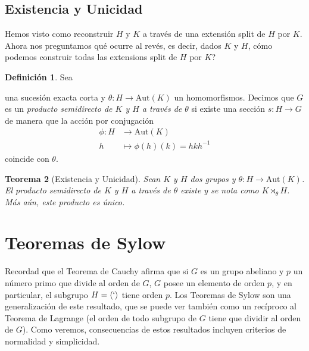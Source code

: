 \documentclass[a4paper,11pt]{amsart}
\theoremstyle{plain}
\newtheorem{thm}{Teorema}[section]
\theoremstyle{definition}
\newtheorem{defi}[thm]{Definición}
\theoremstyle{remark}
\begin{document}
\subsection{Existencia y Unicidad}

Hemos visto como reconstruir $H$ y $K$ a través de una extensión split de $H$ por $K$. Ahora nos preguntamos qué ocurre al revés, es decir, dados $K$ y $H$, cómo podemos construir todas las extensions split de $H$ por $K$? 

\begin{defi}
Sea 
\begin{center}
\end{center}
una sucesión exacta corta y $\theta \colon H \to \text{Aut}(K)$ un homomorfismos. Decimos que $G$ es un \textit{producto semidirecto de $K$ y $H$ a través de $\theta$} si existe una sección $s \colon H \to G$ de manera que la acción por conjugación 
\begin{align*}
    \phi \colon H & \to \text{Aut}(K)\\
    h & \mapsto \phi(h)(k) = hkh^{-1}
\end{align*}
coincide con $\theta$. 
\end{defi}


\begin{thm}[Existencia y Unicidad]
Sean $K$ y $H$ dos grupos y $\theta \colon H \to \text{Aut}(K)$. El producto semidirecto de $K$ y $H$ a través de $\theta$ existe y se nota como $K \rtimes_{\theta} H$. Más aún, este producto es único.
\end{thm}


\section{Teoremas de Sylow}


Recordad que el Teorema de Cauchy afirma que si $G$ es un grupo abeliano y $p$ un número primo que divide al orden de $G$, $G$ posee un elemento de orden $p$, y en particular, el subgrupo $H = \langle `\rangle$ tiene orden $p$. Los Teoremas de Sylow son una generalización de este resultado, que se puede ver también como un recíproco al Teorema de Lagrange (el orden de todo subgrupo de $G$ tiene que dividir al orden de $G$). Como veremos, consecuencias de estos resultados incluyen criterios de normalidad y simplicidad. 
\end{document}
